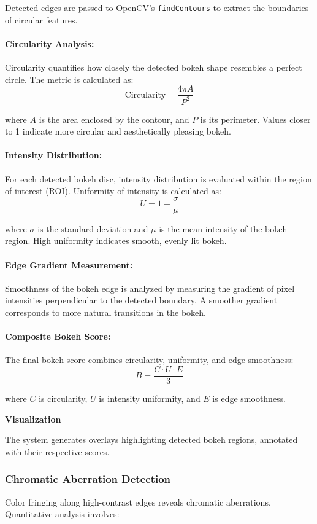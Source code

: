 Detected edges are passed to OpenCV's \texttt{findContours} to extract the boundaries of circular features.

\paragraph{Circularity Analysis:}
Circularity quantifies how closely the detected bokeh shape resembles a perfect circle. The metric is calculated as:
\[
\text{Circularity} = \frac{4\pi A}{P^2}
\]

where \( A \) is the area enclosed by the contour, and \( P \) is its perimeter. Values closer to 1 indicate more circular and aesthetically pleasing bokeh.

\paragraph{Intensity Distribution:}
For each detected bokeh disc, intensity distribution is evaluated within the region of interest (ROI). Uniformity of intensity is calculated as:
\[
U = 1 - \frac{\sigma}{\mu}
\]

where \( \sigma \) is the standard deviation and \( \mu \) is the mean intensity of the bokeh region. High uniformity indicates smooth, evenly lit bokeh.

\paragraph{Edge Gradient Measurement:}
Smoothness of the bokeh edge is analyzed by measuring the gradient of pixel intensities perpendicular to the detected boundary. A smoother gradient corresponds to more natural transitions in the bokeh.

\paragraph{Composite Bokeh Score:}
The final bokeh score combines circularity, uniformity, and edge smoothness:
\[
B = \frac{C \cdot U \cdot E}{3}
\]

where \( C \) is circularity, \( U \) is intensity uniformity, and \( E \) is edge smoothness.

\textbf{Visualization}

The system generates overlays highlighting detected bokeh regions, annotated with their respective scores.


\subsubsection{Chromatic Aberration Detection}
Color fringing along high-contrast edges reveals chromatic aberrations. Quantitative analysis involves:

